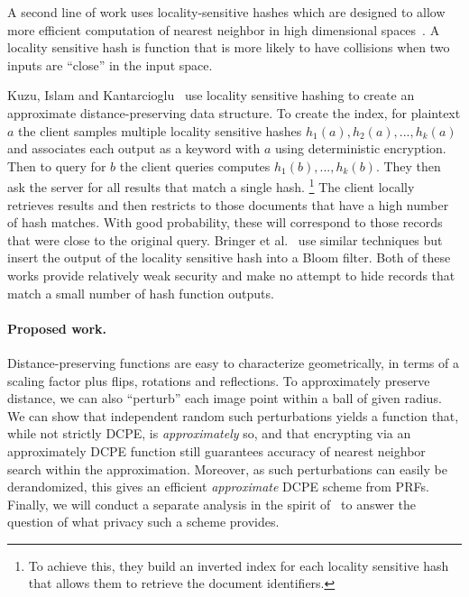 A second line of work uses locality-sensitive hashes which are designed to allow more efficient computation of nearest neighbor in high dimensional spaces~\cite{datar2004locality,slaney2008locality}.  A locality sensitive hash is function that is more likely to have collisions when two inputs are ``close'' in the input space.

Kuzu, Islam and Kantarcioglu~\cite{kuzu2012efficient} use locality sensitive hashing to create an approximate distance-preserving data structure.  To create the index, for plaintext $a$ the client samples multiple locality sensitive hashes $h_1(a), h_2(a),...,h_k(a)$ and associates each output as a keyword with $a$ using deterministic encryption.
Then to query for $b$ the client queries computes $h_1(b),...,h_k(b)$. They then ask the server for all results that match
a single hash.%
\footnote{To achieve this, they build an inverted index for each
locality sensitive hash that allows them to retrieve the document
identifiers.}  The client locally retrieves results and then restricts
to those documents that have a high number of hash matches.  With good
probability, these will correspond to those records that were close to
the original query.  Bringer et
al.~\cite{bringer2011identification,bringer2009error} use similar
techniques but insert the output of the locality sensitive hash into a
Bloom filter.  Both of these works provide relatively weak security and
make no attempt to hide records that match a small number of hash
function outputs.  

\paragraph{Proposed work.}
Distance-preserving functions are easy to characterize geometrically, in terms of a scaling factor plus flips, rotations and reflections.  To approximately preserve distance, we can also  ``perturb'' each image point within a ball of given radius.  
We can show that independent random such perturbations yields a function that, while not strictly DCPE, is \emph{approximately} so, and that encrypting via an approximately DCPE function still guarantees accuracy of nearest neighbor  search within the approximation.  Moreover, as such perturbations can easily be derandomized, this gives an efficient \emph{approximate} DCPE scheme from PRFs.  Finally, we will conduct a separate analysis in the spirit of~\cite{C:BolCheONe11} to answer the question of what privacy such a scheme provides.  

